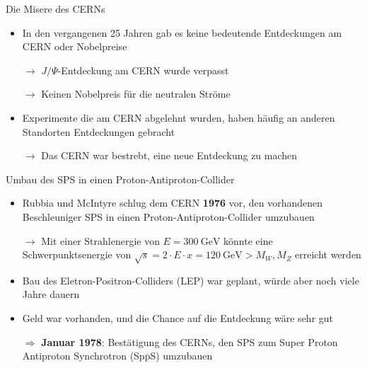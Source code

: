 \documentclass[aspectratio=1610, professionalfonts, 10pt]{beamer}
\begin{document}
\begin{frame}{Die Misere des CERNs}
				\begin{itemize}
					\setlength\itemsep{0.5em}
					\item In den vergangenen 25 Jahren gab es keine bedeutende Entdeckungen am CERN oder Nobelpreise
					\item[$\rightarrow$] $J/\Psi$-Entdeckung am CERN wurde verpasst
					\item[$\rightarrow$] Keinen Nobelpreis für die neutralen Ströme
					\item Experimente die am CERN abgelehnt wurden, haben häufig an anderen Standorten Entdeckungen gebracht
				\end{itemize}
				\vspace*{10px}
				\begin{itemize}
					\item[$\rightarrow$] Das CERN war bestrebt, eine neue Entdeckung zu machen
				\end{itemize}
\end{frame}

\begin{frame}{Umbau des SPS in einen Proton-Antiproton-Collider}
				\begin{itemize}
					\setlength\itemsep{0.5em}
					\item Rubbia und McIntyre schlug dem CERN \textbf{1976} vor, den vorhandenen Beschleuniger SPS in einen Proton-Antiproton-Collider umzubauen
					\item[$\rightarrow$] Mit einer Strahlenergie von $E = \SI{300}{\giga\electronvolt}$ könnte eine Schwerpunktsenergie von $\sqrt{s} = 2 \cdot E \cdot x = \SI{120}{\giga\electronvolt} > M_W, M_Z$ erreicht werden
					\item Bau des Eletron-Positron-Colliders (LEP) war geplant, würde aber noch viele Jahre dauern
					\item Geld war vorhanden, und die Chance auf die Entdeckung wäre sehr gut
				\end{itemize}
					\vspace*{10px}
				\begin{itemize}
					\item[$\Rightarrow$] \textbf{Januar 1978}: Bestätigung des CERNs, den SPS zum Super Proton Antiproton Synchrotron (Sp$\overline{\text{p}}$S) umzubauen
				\end{itemize}
\end{frame}
\end{document}
